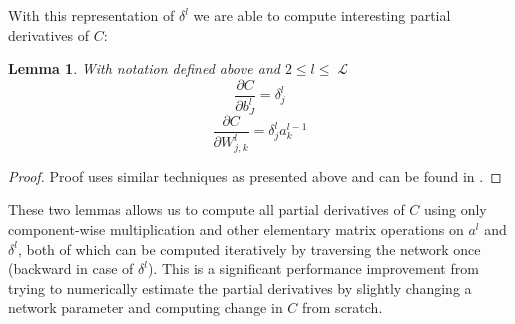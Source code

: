 \documentclass[a4paper]{article}
\theoremstyle{break}
\newtheorem{lemma}[theorem]{Lemma}
\newcommand{\Part}[2]{\frac{\partial #1}{\partial #2}}
\DeclareMathOperator{\La}{\mathcal{L}}
\begin{document}
With this representation of $\delta^l$ we are able to compute interesting partial derivatives of $C$:
\begin{lemma}
    With notation defined above and $ 2 \leq l \leq \La$
     $$ \Part{C}{b_J^l} = \delta_j^l $$
     $$ \Part{C}{W^l_{j, k}} = \delta^l_j a_k^{l-1} $$
\end{lemma}
\begin{proof}
    Proof uses similar techniques as presented above and can be found in \cite[p14]{higham}.
\end{proof}

These two lemmas allows us to compute all partial derivatives of $C$ using only component-wise multiplication and other elementary matrix operations on $a^l$ and $\delta^l$, both of which can be computed iteratively by traversing the network once (backward in case of $\delta^l$). This is a significant performance improvement from trying to numerically estimate the partial derivatives by slightly changing a network parameter and computing change in $C$ from scratch.


\printbibliography
\end{document}
